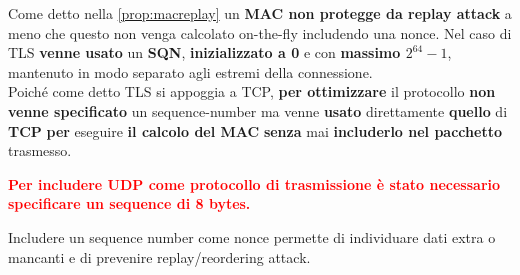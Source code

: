 \begin{remark}
Come detto nella \cref{prop:macreplay} un \textbf{MAC non protegge da replay attack} a meno che questo non venga calcolato on-the-fly includendo una nonce. Nel caso di TLS \textbf{venne usato} un \textbf{SQN}, \textbf{inizializzato a 0} e con \textbf{massimo $2^{64}-1$}, mantenuto in modo separato agli estremi della connessione.\\
Poiché come detto TLS si appoggia a TCP, \textbf{per ottimizzare} il protocollo \textbf{non venne specificato} un sequence-number ma venne \textbf{usato} direttamente \textbf{quello} di \textbf{TCP} \textbf{per} eseguire \textbf{il calcolo del MAC} \textbf{senza} mai \textbf{includerlo nel pacchetto} trasmesso. 
\end{remark}
\begin{remark}
\textbf{\textcolor{red}{Per includere UDP come protocollo di trasmissione è stato necessario specificare un sequence di 8 bytes.}}
\end{remark}
\begin{remark}
Includere un sequence number come nonce permette di individuare dati extra o mancanti e di prevenire replay/reordering attack.
\end{remark}

